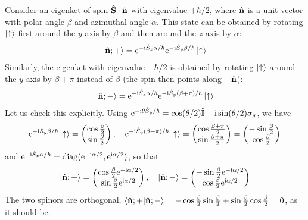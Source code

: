 Consider an eigenket of spin $\hat{\mathbf{S}} \cdot \hat{\mathbf{n}}$ with eigenvalue $+\hbar/2$, where $\hat{\mathbf{n}}$ is a unit vector with polar angle $\beta$ and azimuthal angle $\alpha$. This state can be obtained by rotating $\ket{\uparrow}$ first around the $y$-axis by $\beta$ and then around the $z$-axis by $\alpha$:
\begin{align}
    \ket{\hat{\mathbf{n}};+} = \mathrm{e}^{-\mathrm{i} \hat{S}_z \alpha / \hbar} \mathrm{e}^{-\mathrm{i} \hat{S}_y \beta / \hbar} \ket{\uparrow} \label{eq:spin_n_plus}
\end{align}
Similarly, the eigenket with eigenvalue $-\hbar/2$ is obtained by rotating $\ket{\uparrow}$ around the $y$-axis by $\beta + \pi$ instead of $\beta$ (the spin then points along $-\hat{\mathbf{n}}$):
\begin{align}
    \ket{\hat{\mathbf{n}};-} = \mathrm{e}^{-\mathrm{i} \hat{S}_z \alpha / \hbar} \mathrm{e}^{-\mathrm{i} \hat{S}_y (\beta + \pi) / \hbar} \ket{\uparrow} \label{eq:spin_n_minus}
\end{align}
Let us check this explicitly. Using $\mathrm{e}^{-\mathrm{i} \theta \hat{S}_y / \hbar} = \cos(\theta/2) \hat{\mathbb{I}} - \mathrm{i} \sin(\theta/2) \sigma_y$, we have
\begin{align*}
    \mathrm{e}^{-\mathrm{i} \hat{S}_y \beta / \hbar} \ket{\uparrow} = \begin{pmatrix} \cos\frac{\beta}{2} \\ \sin\frac{\beta}{2} \end{pmatrix}, \quad
    \mathrm{e}^{-\mathrm{i} \hat{S}_y (\beta+\pi) / \hbar} \ket{\uparrow} = \begin{pmatrix} \cos\frac{\beta + \pi}{2} \\ \sin\frac{\beta+\pi}{2} \end{pmatrix} = \begin{pmatrix} -\sin\frac{\beta}{2} \\ \cos\frac{\beta}{2} \end{pmatrix}
\end{align*}
and $\mathrm{e}^{-\mathrm{i} \hat{S}_z \alpha / \hbar} = \mathrm{diag}(\mathrm{e}^{-\mathrm{i} \alpha/2}, \mathrm{e}^{\mathrm{i} \alpha/2})$, so that
\begin{align*}
    \ket{\hat{\mathbf{n}};+} = \begin{pmatrix} \cos\frac{\beta}{2} \mathrm{e}^{-\mathrm{i} \alpha/2} \\ \sin\frac{\beta}{2} \mathrm{e}^{\mathrm{i} \alpha/2} \end{pmatrix}, \quad
    \ket{\hat{\mathbf{n}};-} = \begin{pmatrix} -\sin\frac{\beta}{2} \mathrm{e}^{-\mathrm{i} \alpha/2} \\ \cos\frac{\beta}{2} \mathrm{e}^{\mathrm{i} \alpha/2} \end{pmatrix}
\end{align*}
The two spinors are orthogonal, $\braket{\hat{\mathbf{n}};+|\hat{\mathbf{n}};-} = -\cos\frac{\beta}{2}\sin\frac{\beta}{2} + \sin\frac{\beta}{2}\cos\frac{\beta}{2} = 0$, as it should be.

